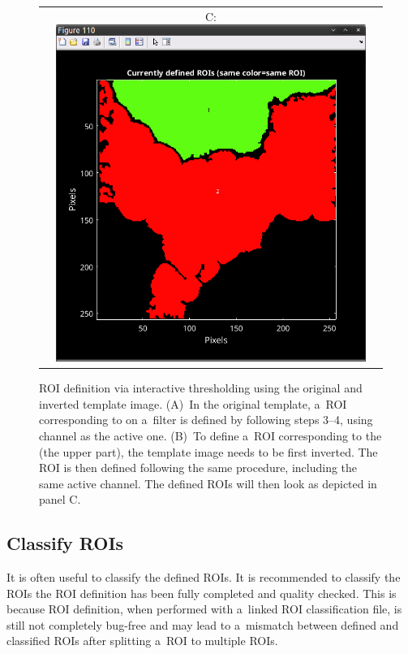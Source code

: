 \begin{figure}[!ht]
\begin{tabular}{ccc}
&
C: \includegraphics[scale=0.19]{figs3/LANS-roi-interactive8}
\end{tabular}
\caption{\label{fig:interactive-invert}%
ROI definition via interactive thresholding using the original and inverted template image. (A)~In the original template, a~ROI corresponding to  on a~filter is defined by following steps 3--4, using  channel as the active one. (B)~To define a~ROI corresponding to the  (the upper part), the template image needs to be first inverted. The ROI is then defined following the same procedure, including the same active channel. The defined ROIs will then look as depicted in panel C.}
\end{figure}


\subsection{Classify ROIs}

\goldbox{}
It is often useful to classify the defined ROIs. It is recommended to classify the ROIs  the ROI definition has been fully completed and quality checked. This is because ROI definition, when performed with a~linked ROI classification file, is still not completely bug-free and may lead to a~mismatch between defined and classified ROIs after splitting a~ROI to multiple ROIs.
\tcbe

